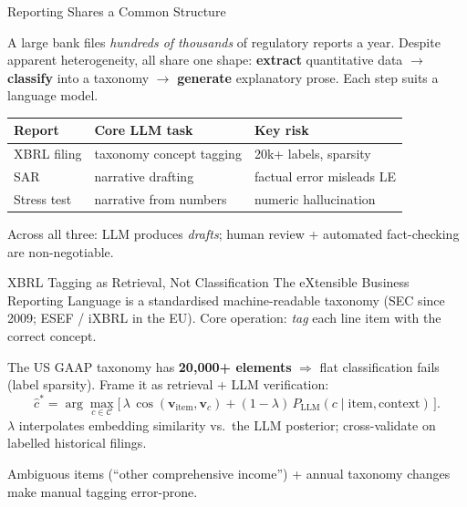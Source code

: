 \documentclass[9pt,t]{beamer}
\begin{document}
\begin{frame}{Reporting Shares a Common Structure}
\begin{bigpicture}
A large bank files \emph{hundreds of thousands} of regulatory reports a year.
Despite apparent heterogeneity, all share one shape: \textbf{extract} quantitative
data $\to$ \textbf{classify} into a taxonomy $\to$ \textbf{generate} explanatory
prose. Each step suits a language model.
\end{bigpicture}

\medskip
\begin{tabular}{lll}
\toprule
\textbf{Report} & \textbf{Core LLM task} & \textbf{Key risk} \\
\midrule
XBRL filing & taxonomy concept tagging & 20k+ labels, sparsity \\
SAR & narrative drafting & factual error misleads LE \\
Stress test & narrative from numbers & numeric hallucination \\
\bottomrule
\end{tabular}

\medskip
\footnotesize Across all three: LLM produces \emph{drafts}; human review +
automated fact-checking are non-negotiable.
\end{frame}

\begin{frame}{XBRL Tagging as Retrieval, Not Classification}
The eXtensible Business Reporting Language is a standardised machine-readable
taxonomy (SEC since 2009; ESEF / iXBRL in the EU). Core operation: \emph{tag}
each line item with the correct concept.

\medskip
\begin{underhood}
The US GAAP taxonomy has \textbf{20,000+ elements} $\Rightarrow$ flat
classification fails (label sparsity). Frame it as retrieval + LLM verification:
\[
\hat c^* = \arg\max_{c \in \mathcal{C}}
\Big[\, \lambda\, \cos(\mathbf{v}_{\text{item}}, \mathbf{v}_c)
   + (1-\lambda)\, P_{\text{LLM}}(c \mid \text{item}, \text{context}) \,\Big].
\]
$\lambda$ interpolates embedding similarity vs.\ the LLM posterior; cross-validate
on labelled historical filings.
\end{underhood}

\medskip
\footnotesize Ambiguous items (``other comprehensive income'') + annual taxonomy
changes make manual tagging error-prone.
\end{frame}
\end{document}
